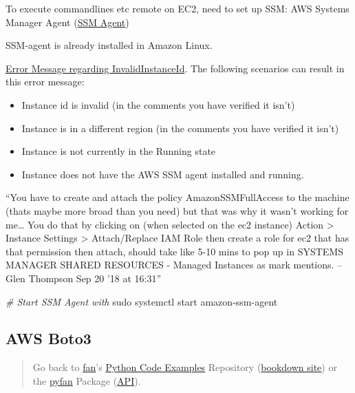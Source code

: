 \documentclass[
]{book}
\newenvironment{Shaded}{\begin{snugshade}}{\end{snugshade}}
\newcommand{\CommentTok}[1]{\textcolor[rgb]{0.56,0.35,0.01}{\textit{#1}}}
\newcommand{\FunctionTok}[1]{\textcolor[rgb]{0.00,0.00,0.00}{#1}}
\newcommand{\NormalTok}[1]{#1}
\providecommand{\tightlist}{%
  \setlength{\itemsep}{0pt}\setlength{\parskip}{0pt}}
\begin{document}
To execute commandlines etc remote on EC2, need to set up SSM: AWS Systems Manager Agent (\href{https://docs.aws.amazon.com/systems-manager/latest/userguide/ssm-agent.html}{SSM Agent})

SSM-agent is already installed in Amazon Linux.

\href{https://stackoverflow.com/questions/47034797/invalidinstanceid-an-error-occurred-invalidinstanceid-when-calling-the-sendco}{Error Message regarding InvalidInstanceId}. The following scenarios can result in this error message:

\begin{itemize}
\tightlist
\item
  Instance id is invalid (in the comments you have verified it isn't)
\item
  Instance is in a different region (in the comments you have verified it isn't)
\item
  Instance is not currently in the Running state
\item
  Instance does not have the AWS SSM agent installed and running.
\end{itemize}

``You have to create and attach the policy AmazonSSMFullAccess to the machine (thats maybe more broad than you need) but that was why it wasn't working for me\ldots{} You do that by clicking on (when selected on the ec2 instance) Action \textgreater{} Instance Settings \textgreater{} Attach/Replace IAM Role then create a role for ec2 that has that permission then attach, should take like 5-10 mins to pop up in SYSTEMS MANAGER SHARED RESOURCES - Managed Instances as mark mentions. -- Glen Thompson Sep 20 '18 at 16:31''

\begin{Shaded}
\begin{Highlighting}[]
\CommentTok{\# Start SSM Agent with}
\FunctionTok{sudo}\NormalTok{ systemctl start amazon{-}ssm{-}agent}
\end{Highlighting}
\end{Shaded}

\hypertarget{aws-boto3}{%
\subsection{AWS Boto3}\label{aws-boto3}}

\begin{quote}
Go back to \href{http://fanwangecon.github.io/}{fan}'s \href{https://fanwangecon.github.io/Py4Econ/}{Python Code Examples} Repository (\href{https://fanwangecon.github.io/Py4Econ/bookdown}{bookdown site}) or the \href{https://pyfan.readthedocs.io/en/latest/}{pyfan} Package (\href{https://pyfan.readthedocs.io/en/latest/reference.html}{API}).
\end{quote}
\end{document}
